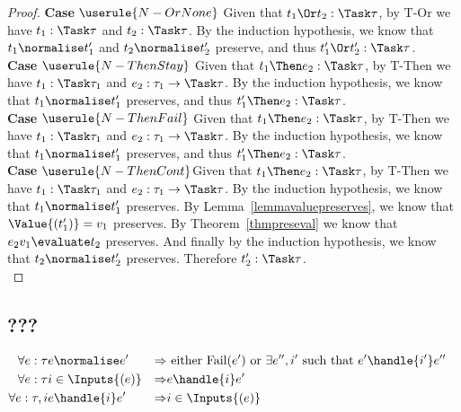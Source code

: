 \begin{proof}
  \noindent\textbf{Case} $\userule{N-OrNone}$ Given that $t_1\Or t_2:\Task\tau$,
  by T-Or we have $t_1:\Task\tau$ and $t_2:\Task\tau$. By the induction hypothesis,
  we know that $t_1\normalise t_1'$ and $t_2\normalise t_2'$ preserve, and thus
  $t_1'\Or t_2':\Task\tau$.\\

  \noindent\textbf{Case} $\userule{N-ThenStay}$ Given that $t_1\Then e_2:\Task\tau$,
  by T-Then we have $t_1:\Task\tau_1$ and $e_2:\tau_1\to\Task\tau$. By the induction
  hypothesis, we know that $t_1\normalise t_1'$ preserves, and thus $t_1'\Then e_2:\Task\tau$.\\

  \noindent\textbf{Case} $\userule{N-ThenFail}$ Given that $t_1\Then e_2:\Task\tau$,
  by T-Then we have $t_1:\Task\tau_1$ and $e_2:\tau_1\to\Task\tau$. By the induction
  hypothesis, we know that $t_1\normalise t_1'$ preserves, and thus $t_1'\Then e_2:\Task\tau$.\\

  \noindent\textbf{Case} $\userule{N-ThenCont}$Given that $t_1\Then e_2:\Task\tau$,
  by T-Then we have $t_1:\Task\tau_1$ and $e_2:\tau_1\to\Task\tau$. By the induction
  hypothesis, we know that $t_1\normalise t_1'$ preserves. By
  Lemma~\ref{lemmavaluepreserves}, we know that $\Value{(t_1')}=v_1$ preserves.
  By Theorem~\ref{thmpreseval} we know that $e_2 v_1\evaluate t_2$ preserves. And
  finally by the induction hypothesis, we know that $t_2\normalise t_2'$ preserves.
  Therefore $t_2':\Task\tau$.\\

\end{proof}
\subsection{???}

\begin{align*}
  \forall e:\tau & e \normalise e' &\implies& \text{ either Fail}(e') \text{ or } \exists e'',i' \text{ such that } e'\handle{i'}e''&\\
  \forall e:\tau & i\in\Inputs{(e)} &\implies& e\handle{i}e'\\
  \forall e:\tau, i & e\handle{i}e' &\implies& i\in\Inputs{(e)}
\end{align*}
